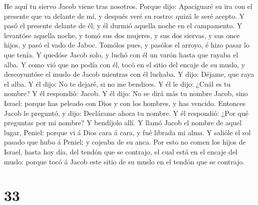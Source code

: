 He aquí tu siervo Jacob viene tras nosotros. Porque dijo: Apaciguaré su
ira con el presente que va delante de mí, y después veré su rostro:
quizá le seré acepto.  Y pasó el presente delante de él;
y él durmió aquella noche en el campamento.  Y levantóse
aquella noche, y tomó sus dos mujeres, y sus dos siervas, y sus once
hijos, y pasó el vado de Jaboc.  Tomólos pues, y pasólos
el arroyo, é hizo pasar lo que tenía.  Y quedóse Jacob
solo, y luchó con él un varón hasta que rayaba el alba. 
Y como vió que no podía con él, tocó en el sitio del encaje de su muslo,
y descoyuntóse el muslo de Jacob mientras con él luchaba.
 Y dijo: Déjame, que raya el alba. Y él dijo: No te
dejaré, si no me bendices.  Y él le dijo: ¿Cuál es tu
nombre? Y él respondió: Jacob.  Y él dijo: No se dirá más
tu nombre Jacob, sino Israel: porque has peleado con Dios y con los
hombres, y has vencido.  Entonces Jacob le preguntó, y
dijo: Declárame ahora tu nombre. Y él respondió: ¿Por qué preguntas por
mi nombre? Y bendíjolo allí.  Y llamó Jacob el nombre de
aquel lugar, Peniel: porque vi á Dios cara á cara, y fué librada mi
alma.  Y salióle el sol pasado que hubo á Peniel; y
cojeaba de su anca.  Por esto no comen los hijos de
Israel, hasta hoy día, del tendón que se contrajo, el cual está en el
encaje del muslo: porque tocó á Jacob este sitio de su muslo en el
tendón que se contrajo.

\hypertarget{section-32}{%
\section{33}\label{section-32}}

